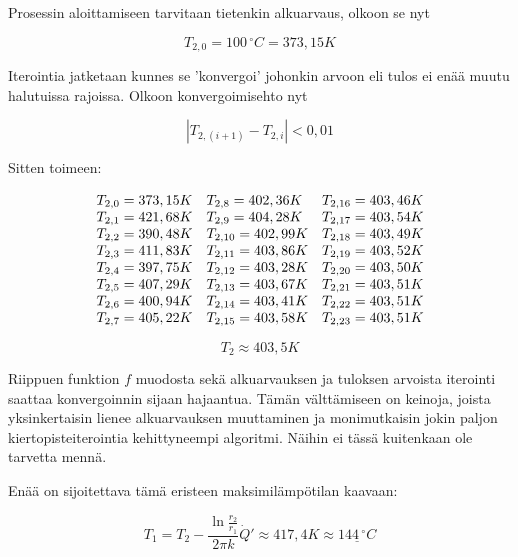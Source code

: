 \documentclass[12pt,a4paper,finnish]{article}
\begin{document}
Prosessin aloittamiseen tarvitaan tietenkin alkuarvaus, olkoon se nyt 

\begin{equation}
  T_{2, 0} = 100 \,^{\circ}C = 373,15K
\end{equation}

Iterointia jatketaan kunnes se 'konvergoi' johonkin arvoon eli tulos ei enää muutu halutuissa rajoissa. 
Olkoon konvergoimisehto nyt

\begin{equation}
 |T_{2,(i+1)} - T_{2,i}| < 0,01
\end{equation}

Sitten toimeen:

\begin{equation}
  \begin{array}{l l l}
    T_{2,0} = 373,15 K &  T_{2,8} = 402,36 K &  T_{2,16} = 403,46 K \\
    T_{2,1} = 421,68 K &  T_{2,9} = 404,28 K &  T_{2,17} = 403,54 K \\
    T_{2,2} = 390,48 K &  T_{2,10} = 402,99 K &  T_{2,18} = 403,49 K \\
    T_{2,3} = 411,83 K &  T_{2,11} = 403,86 K &  T_{2,19} = 403,52 K \\
    T_{2,4} = 397,75 K &  T_{2,12} = 403,28 K &  T_{2,20} = 403,50 K \\
    T_{2,5} = 407,29 K &  T_{2,13} = 403,67 K &  T_{2,21} = 403,51 K \\
    T_{2,6} = 400,94 K &  T_{2,14} = 403,41 K &  T_{2,22} = 403,51 K \\
    T_{2,7} = 405,22 K &  T_{2,15} = 403,58 K &  T_{2,23} = 403,51 K
  \end{array}
\end{equation}

\begin{equation}
 T_2 \approx 403,5 K
\end{equation}

Riippuen funktion $f$ muodosta sekä alkuarvauksen ja tuloksen arvoista iterointi saattaa konvergoinnin 
sijaan hajaantua. Tämän välttämiseen on keinoja, joista yksinkertaisin lienee alkuarvauksen muuttaminen ja 
monimutkaisin jokin paljon kiertopisteiterointia kehittyneempi algoritmi. Näihin ei tässä kuitenkaan ole 
tarvetta mennä.

Enää on sijoitettava tämä eristeen maksimilämpötilan kaavaan:

\begin{equation}
 T_1 = T_2 - \frac{\ln \frac{r_2}{r_1}}{2\pi k}\dot{Q}' \approx 417,4 K \approx \underline{144\,^{\circ}C}
\end{equation}
\end{document}
